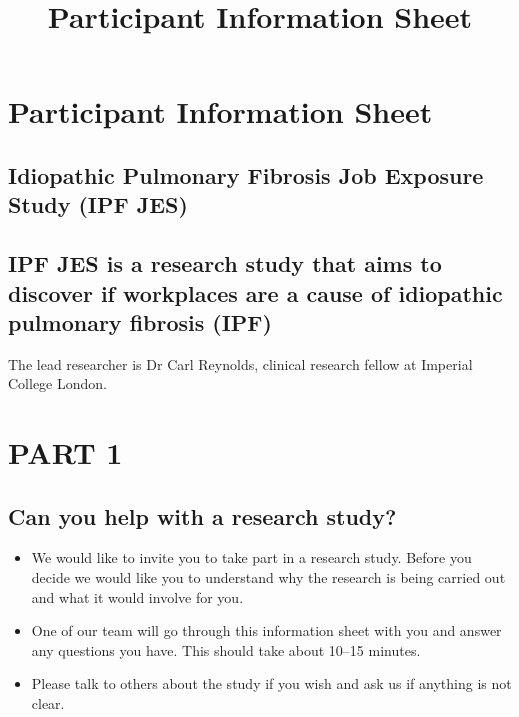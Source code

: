 \documentclass[a4paper,10pt]{article}
\title{\bf Participant Information Sheet}
\date{}
\begin{document}
\pagestyle{fancy} 






\section*{}
\vspace{0.5cm}
\section*{Participant Information Sheet}

\subsection*{Idiopathic Pulmonary Fibrosis Job Exposure Study (IPF JES)}
\subsection*{IPF JES is a research study that aims to discover if workplaces are a cause of idiopathic pulmonary fibrosis (IPF)}

The lead researcher is Dr Carl Reynolds, clinical research fellow at Imperial College London.

\section*{PART 1}
\subsection*{Can you help with a research study?}

\begin{itemize}
 \item We would like to invite you to take part in a research study. Before you decide we would like you to understand why the research is being carried out and what it would involve for you.  
 \item One of our team will go through this information sheet with you and answer any questions you have. This should take about 10--15 minutes.
 \item Please talk to others about the study if you wish and ask us if anything is not clear.
\end{itemize}
\end{document}
